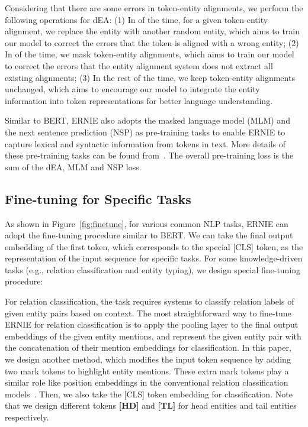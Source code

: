 \documentclass[11pt,a4paper]{article}
\begin{document}
Considering that there are some errors in token-entity alignments, we perform the following operations for dEA: (1) In  of the time, for a given token-entity alignment, we replace the entity with another random entity, which aims to train our model to correct the errors that the token is aligned with a wrong entity; (2) In  of the time, we mask token-entity alignments, which aims to train our model to correct the errors that the entity alignment system does not extract all existing alignments; (3) In the rest of the time, we keep token-entity alignments unchanged, which aims to encourage our model to integrate the entity information into token representations for better language understanding.

Similar to BERT, ERNIE also adopts the masked language model (MLM) and the next sentence prediction (NSP) as pre-training tasks to enable ERNIE to capture lexical and syntactic information from tokens in text. More details of these pre-training tasks can be found from~. The overall pre-training loss is the sum of the dEA, MLM and NSP loss.









\subsection{Fine-tuning for Specific Tasks}
\label{sec:fine-tuning}



As shown in Figure~\ref{fig:finetune}, for various common NLP tasks, ERNIE can adopt the fine-tuning procedure similar to BERT. We can take the final output embedding of the first token, which corresponds to the special [CLS] token, as the representation of the input sequence for specific tasks. For some knowledge-driven tasks (e.g., relation classification and entity typing), we design special fine-tuning procedure:

For relation classification, the task requires systems to classify relation labels of given entity pairs based on context. The most straightforward way to fine-tune ERNIE for relation classification is to apply the pooling layer to the final output embeddings of the given entity mentions, and represent the given entity pair with the concatenation of their mention embeddings for classification. In this paper, we design another method, which modifies the input token sequence by adding two mark tokens to highlight entity mentions. These extra mark tokens play a similar role like position embeddings in the conventional relation classification models~\cite{zeng2015distant}. Then, we also take the [CLS] token embedding for classification. Note that we design different tokens \textbf{[HD]} and \textbf{[TL]} for head entities and tail entities respectively.
\end{document}
